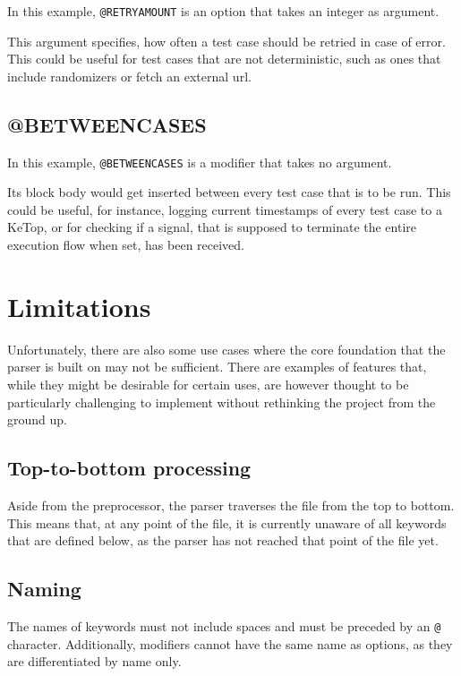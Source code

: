 In this example, \verb|@RETRYAMOUNT| is an option that takes an integer as argument. 

This argument specifies, how often a test case should be retried in case of error. This could be useful for test cases that are not deterministic, such as ones that include randomizers or fetch an external \gls{url}.

\subsection{@BETWEENCASES}

In this example, \verb|@BETWEENCASES| is a modifier that takes no argument. 

Its block body would get inserted between every test case that is to be run. This could be useful, for instance, logging current timestamps of every test case to a KeTop, or for checking if a signal, that is supposed to terminate the entire execution flow when set, has been received. 

\section{Limitations}

Unfortunately, there are also some use cases where the core foundation that the parser is built on may not be sufficient. There are examples of features that, while they might be desirable for certain uses, are however thought to be particularly challenging to implement without rethinking the project from the ground up.

\subsection{Top-to-bottom processing}

Aside from the preprocessor, the parser traverses the file from the top to bottom. This means that, at any point of the file, it is currently unaware of all keywords that are defined below, as the parser has not reached that point of the file yet.

\subsection{Naming}

The names of keywords must not include spaces and must be preceded by an \verb|@| character. Additionally, modifiers cannot have the same name as options, as they are differentiated by name only. 

